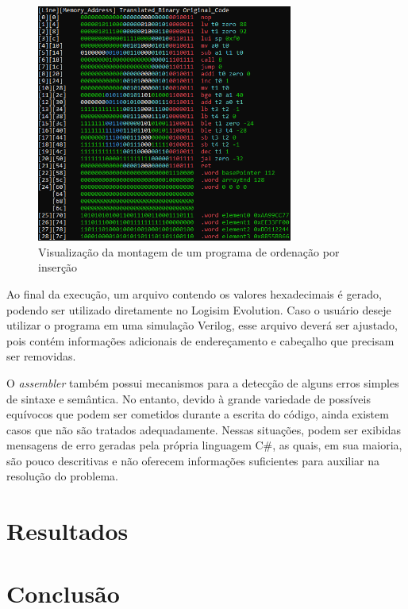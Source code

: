 \documentclass[
	12pt,				%
	openright,			%
	oneside,			%
	a4paper,			%
	english,			%
	french,				%
	spanish,			%
	brazil,				%
	]{abntex2}
\begin{document}
\begin{figure}[h]
    \centering
    \includegraphics[width=0.75\textwidth]{ProcessoDesenvolvimento/Assembler/assemblyProcess.png}
    \caption{Visualização da montagem de um programa de ordenação por inserção}
    \label{fig:assemblyProcess}
\end{figure}

Ao final da execução, um arquivo contendo os valores hexadecimais é gerado, podendo ser utilizado diretamente no Logisim Evolution. Caso o usuário deseje utilizar o programa em uma simulação Verilog, esse arquivo deverá ser ajustado, pois contém informações adicionais de endereçamento e cabeçalho que precisam ser removidas.

O \textit{assembler} também possui mecanismos para a detecção de alguns erros simples de sintaxe e semântica. No entanto, devido à grande variedade de possíveis equívocos que podem ser cometidos durante a escrita do código, ainda existem casos que não são tratados adequadamente. Nessas situações, podem ser exibidas mensagens de erro geradas pela própria linguagem C\#, as quais, em sua maioria, são pouco descritivas e não oferecem informações suficientes para auxiliar na resolução do problema.

\chapter{Resultados}
\chapter{Conclusão}

\end{document}
